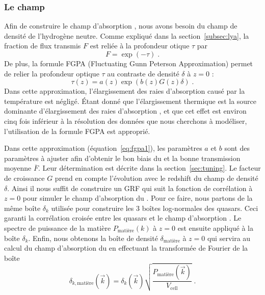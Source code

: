 \subsubsection{Le champ \lya{}}
\label{subsubsec:lya_field}
Afin de construire le champ d'absorption \lya{}, nous avons besoin du champ de densité de l'hydrogène neutre. Comme expliqué dans la section~\ref{subsec:lya}, la fraction de flux transmis $F$ est reliée à la profondeur otique $\tau$ par
\begin{equation}
  F = \exp(- \tau) \; .
\end{equation}
De plus, la formule FGPA (Fluctuating Gunn Peterson Approximation) permet de relier la profondeur optique $\tau$ au contraste de densité $\delta$ à $z = 0$ :
\begin{equation}
  \label{eq:fgpa1}
  \tau(z) = a(z) \exp(b(z) G(z) \delta) \; .
\end{equation}
Dans cette approximation, l'élargissement des raies d'absorption causé par la température est négligé. Étant donné que l'élargissement thermique est la source dominante d'élargissement des raies d'absorption \lya{}, et que cet effet est environ cinq fois inférieur à la résolution des données que nous cherchons à modéliser, l'utilisation de la formule FGPA est approprié.

Dans cette approximation (équation~\ref{eq:fgpa1}), les paramètres $a$ et $b$ sont des paramètres à ajuster afin d'obtenir le bon biais du \lya{} et la bonne transmission moyenne $\overline F$. Leur détermination est décrite dans la section~\ref{sec:tuning}. Le facteur de croissance $G$ prend en compte l'évolution avec le redshift du champ de densité $\delta$. Ainsi il nous suffit de construire un GRF qui suit la fonction de corrélation à $z=0$ pour simuler le champ d'absorption du \lya{}. Pour ce faire, nous partons de la même boîte $\delta_k$ utilisée pour construire les 3 boîtes log-normales des quasars. Ceci garanti la corrélation croisée entre les quasars et le champ d'absorption \lya{}. Le spectre de puissance de la matière $P_{\mathrm{matière}}(k)$ à $z=0$ est ensuite appliqué à la boîte $\delta_k$. Enfin, nous obtenons la boîte de densité $\delta_{\mathrm{matière}}$ à $z = 0$ qui servira au calcul du champ d'absorption du \lya{} en effectuant la transformée de Fourier de la boîte
\begin{equation}
  \delta_{k, \mathrm{matière}}(\vec k)  = \delta_k(\vec k) \sqrt{\frac{P_{\mathrm{matière}}(\vec k)}{V_{\mathrm{cell}}}} \; .
\end{equation}


